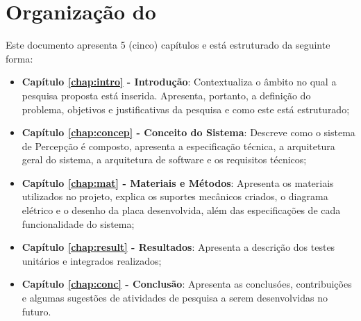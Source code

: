 \section{Organização do \thetypework}
\label{section:organizacao}

Este documento apresenta 5 (cinco) capítulos e está estruturado da seguinte forma:

\begin{itemize}

  \item \textbf{Capítulo \ref{chap:intro} - Introdução}: Contextualiza o âmbito no qual a pesquisa proposta está inserida. Apresenta, portanto, a definição do problema, objetivos e justificativas da pesquisa e como este \thetypeworkthree está estruturado;

  \item \textbf{Capítulo \ref{chap:concep} - Conceito do Sistema}: Descreve como o sistema de Percepção é composto, apresenta a especificação técnica, a arquitetura geral do sistema, a arquitetura de software e os requisitos técnicos;
  
  \item \textbf{Capítulo \ref{chap:mat} - Materiais e Métodos}: Apresenta os materiais utilizados no projeto, explica os suportes mecânicos criados, o diagrama elétrico e o desenho da placa desenvolvida, além das especificações de cada funcionalidade do sistema;
  
  \item \textbf{Capítulo \ref{chap:result} - Resultados}: Apresenta a descrição dos testes unitários e integrados realizados;
 
  \item \textbf{Capítulo \ref{chap:conc} - Conclusão}: Apresenta as conclusóes, contribuições e algumas sugestões de atividades de pesquisa a serem desenvolvidas no futuro.

\end{itemize}

